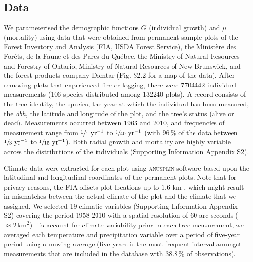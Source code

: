 \subsection{Data}
We parameterised the demographic functions $ G $ (individual growth) and $ \mu $ (mortality) using data that were obtained from permanent sample plots of the Forest Inventory and Analysis (FIA, USDA Forest Service), the Ministère des Forêts, de la Faune et des Parcs du Québec, the Ministry of Natural Resources and Forestry of Ontario, Ministry of Natural Resources of New Brunswick, and the forest products company Domtar (Fig. S2.2 for a map of the data). After removing plots that experienced fire or logging, there were \num{7704442} individual measurements (106 species distributed among \num{132240} plots). A record consists of the tree identity, the species, the year at which the individual has been measured, the \textit{\textit{dbh}}, the latitude and longitude of the plot, and the tree's status (alive or dead). Measurements occurred between 1963 and 2010, and frequencies of measurement range from $ \sfrac{1}{1} \text{ yr}^{-1} $ to $ \sfrac{1}{40} \text{ yr}^{-1} $ (with $ 96 \, \% $ of the data between $ \sfrac{1}{3} \text{ yr}^{-1} $ to $ \sfrac{1}{15} \text{ yr}^{-1} $). Both radial growth and mortality are highly variable across the distributions of the individuals (Supporting Information Appendix S2).

Climate data were extracted for each plot using \textsc{anusplin} software \citep{McKenney2011} based upon the latitudinal and longitudinal coordinates of the permanent plots. Note that for privacy reasons, the FIA offsets plot locations up to $ 1.6 $ km \citep{Gray2012}, which might result in mismatches between the actual climate of the plot and the climate that we assigned. We selected 19 climatic variables (Supporting Information Appendix S2) covering the period 1958-2010 with a spatial resolution of 60 arc seconds ($ \approx 2 \, \text{km}^2 $). To account for climate variability prior to each tree measurement, we averaged each temperature and precipitation variable over a period of five-year period using a moving average (five years is the most frequent interval amongst measurements that are included in the database with $ 38.8 \, \% $ of observations).

